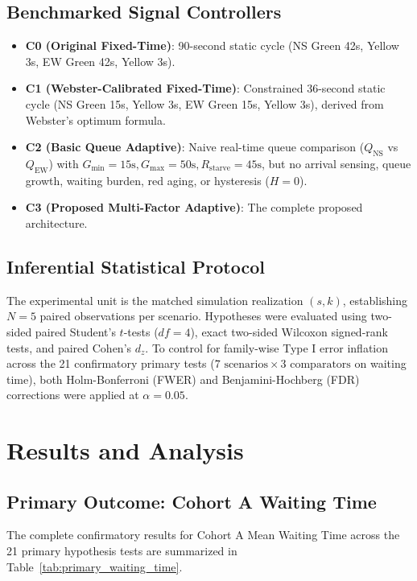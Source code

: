 \documentclass[11pt,journal,onecolumn]{article}
\begin{document}
\subsection{Benchmarked Signal Controllers}
\begin{itemize}
    \item \textbf{C0 (Original Fixed-Time)}: 90-second static cycle (NS Green 42s, Yellow 3s, EW Green 42s, Yellow 3s).
    \item \textbf{C1 (Webster-Calibrated Fixed-Time)}: Constrained 36-second static cycle (NS Green 15s, Yellow 3s, EW Green 15s, Yellow 3s), derived from Webster's optimum formula.
    \item \textbf{C2 (Basic Queue Adaptive)}: Naive real-time queue comparison ($Q_{\text{NS}}$ vs $Q_{\text{EW}}$) with $G_{\text{min}}=15\text{s}, G_{\text{max}}=50\text{s}, R_{\text{starve}}=45\text{s}$, but no arrival sensing, queue growth, waiting burden, red aging, or hysteresis ($H=0$).
    \item \textbf{C3 (Proposed Multi-Factor Adaptive)}: The complete proposed architecture.
\end{itemize}

\subsection{Inferential Statistical Protocol}
The experimental unit is the matched simulation realization $(s, k)$, establishing $N = 5$ paired observations per scenario. Hypotheses were evaluated using two-sided paired Student's $t$-tests ($df = 4$), exact two-sided Wilcoxon signed-rank tests, and paired Cohen's $d_z$. To control for family-wise Type I error inflation across the 21 confirmatory primary tests ($7 \text{ scenarios} \times 3 \text{ comparators}$ on waiting time), both Holm-Bonferroni (FWER) and Benjamini-Hochberg (FDR) corrections were applied at $\alpha = 0.05$.

\section{Results and Analysis}
\subsection{Primary Outcome: Cohort A Waiting Time}
The complete confirmatory results for Cohort A Mean Waiting Time across the 21 primary hypothesis tests are summarized in Table~\ref{tab:primary_waiting_time}.
\end{document}

